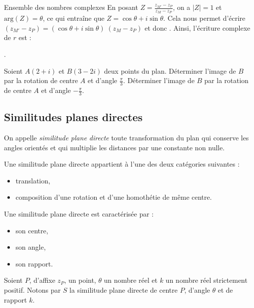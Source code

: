 \begin{chapter}{Ensemble des nombres complexes}
En posant $Z = \frac{z_{M'} - z_P}{z_M - z_P}$, on a $|Z| = 1$ et $\text{arg} (Z) = \theta$, ce qui entra\^ine que 
$Z = \cos \theta + i \sin \theta$. 
Cela nous permet d'\'ecrire $( z_{M'} - z_P ) = ( \cos \theta + i \sin \theta) \; ( z_M - z_P )$ et donc 
.
Ainsi, l'\'ecriture complexe de $r$ est : 
\begin{center}
.
\end{center}
%
\begin{exe}
Soient $A (2 + i ) $ et $B (3 - 2 i)$ deux points du plan. 
D\'eterminer l'image de $B$ par la rotation de centre $A$ et d'angle $\frac{\pi}{3}$.
D\'eterminer l'image de $B$ par la rotation de centre $A$ et d'angle $-\frac{\pi}{3}$.
\end{exe}
%
\subsection{Similitudes planes directes}
      \begin{defi}
      On appelle \emph{similitude plane directe} toute transformation du plan qui conserve les angles orient\'es
      et qui multiplie les distances par une constante non nulle.
      \end{defi}
      \begin{thm}
      Une similitude plane directe appartient \`a l'une des deux cat\'egories suivantes :
            \begin{itemize}
                  \item translation,
                  \item composition d'une rotation et d'une homoth\'etie de m\^eme centre.
            \end{itemize}
      \end{thm}
      \begin{prop}
      Une similitude plane directe est caract\'eris\'ee par : 
            \begin{itemize}
                  \item son centre,
                  \item son angle,
                  \item son rapport.
            \end{itemize}
      \end{prop}
      \begin{prop}
            Soient $P$, d'affixe $z_P$, un point, $\theta$ un nombre r\'eel et $k$ un nombre r\'eel strictement positif.
            Notons par $S$ la similitude plane directe de centre $P$, d'angle $\theta$ et de rapport $k$.
            

\end{prop}
\end{chapter}
